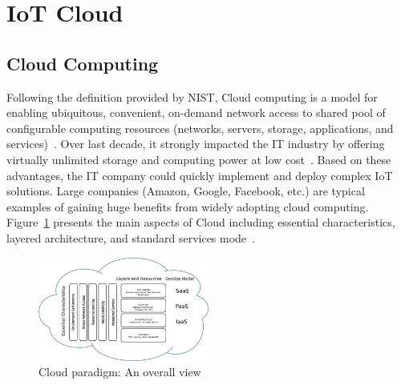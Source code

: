
\section{IoT Cloud}

\subsection{Cloud Computing}


Following the definition provided by NIST, Cloud computing is a model for enabling ubiquitous, convenient, on-demand network access to shared pool of configurable computing resources (networks, servers, storage, applications, and services)~\cite{mell2011nist}. Over last decade, it strongly impacted the IT industry by offering virtually unlimited storage and computing power at low cost~\cite{spillner2013creating}. Based on these advantages, the IT company could quickly implement and deploy complex IoT solutions. Large companies (Amazon, Google, Facebook, etc.) are typical examples of gaining huge benefits from widely adopting cloud computing. Figure~\ref{fig:c2_cloud_paradigm_overview} presents the main aspects of Cloud including essential characteristics, layered architecture, and standard services mode~\cite{botta2014integration}.

\begin{figure}[h!] 
 \begin{center} 
 \includegraphics[width=0.5\textwidth]{./Part1/Chapter2/figures/c2_cloud_paradigm_overview.jpg} 
    \caption{Cloud paradigm: An overall view}
     \label{fig:c2_cloud_paradigm_overview}
  \end{center} 
\end{figure}

